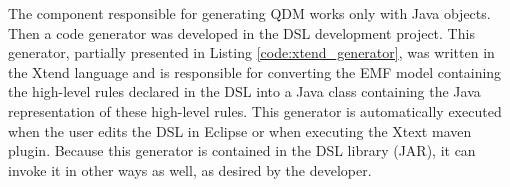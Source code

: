 \documentclass[AMA,STIX1COL]{WileyNJD-v2}
\begin{document}

The component responsible for generating QDM works only with Java objects. Then a code generator was developed in the DSL development project. This generator, partially presented in Listing \ref{code:xtend_generator}, was written in the Xtend language and is responsible for converting the EMF model containing the high-level rules declared in the DSL into a Java class containing the Java representation of these high-level rules. This generator is automatically executed when the user edits the DSL in Eclipse or when executing the Xtext maven plugin. Because this generator is contained in the DSL library (JAR), it can invoke it in other ways as well, as desired by the developer.

\end{document}
